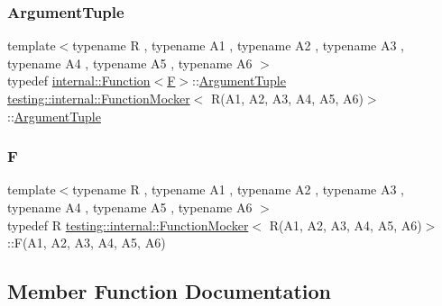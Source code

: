 \subsubsection{\texorpdfstring{Argument\+Tuple}{ArgumentTuple}}
{\footnotesize\ttfamily template$<$typename R , typename A1 , typename A2 , typename A3 , typename A4 , typename A5 , typename A6 $>$ \\
typedef \hyperlink{structtesting_1_1internal_1_1_function}{internal\+::\+Function}$<$\hyperlink{classtesting_1_1internal_1_1_function_mocker_3_01_r_07_a1_00_01_a2_00_01_a3_00_01_a4_00_01_a5_00_01_a6_08_4_a5373cd66051f0a54e83b0497004df058}{F}$>$\+::\hyperlink{classtesting_1_1internal_1_1_function_mocker_3_01_r_07_a1_00_01_a2_00_01_a3_00_01_a4_00_01_a5_00_01_a6_08_4_a0c8bc671adc8e67e8a49a01432407139}{Argument\+Tuple} \hyperlink{classtesting_1_1internal_1_1_function_mocker}{testing\+::internal\+::\+Function\+Mocker}$<$ R(A1, A2, A3, A4, A5, A6)$>$\+::\hyperlink{classtesting_1_1internal_1_1_function_mocker_3_01_r_07_a1_00_01_a2_00_01_a3_00_01_a4_00_01_a5_00_01_a6_08_4_a0c8bc671adc8e67e8a49a01432407139}{Argument\+Tuple}}

\mbox{\label{classtesting_1_1internal_1_1_function_mocker_3_01_r_07_a1_00_01_a2_00_01_a3_00_01_a4_00_01_a5_00_01_a6_08_4_a5373cd66051f0a54e83b0497004df058}} 
\subsubsection{\texorpdfstring{F}{F}}
{\footnotesize\ttfamily template$<$typename R , typename A1 , typename A2 , typename A3 , typename A4 , typename A5 , typename A6 $>$ \\
typedef R \hyperlink{classtesting_1_1internal_1_1_function_mocker}{testing\+::internal\+::\+Function\+Mocker}$<$ R(A1, A2, A3, A4, A5, A6)$>$\+::F(A1, A2, A3, A4, A5, A6)}



\subsection{Member Function Documentation}
\mbox{\label{classtesting_1_1internal_1_1_function_mocker_3_01_r_07_a1_00_01_a2_00_01_a3_00_01_a4_00_01_a5_00_01_a6_08_4_a8499277f15101fefacbb0c9d93b8153b}} 
